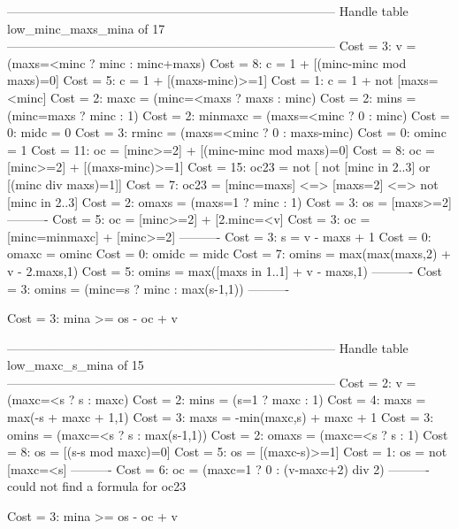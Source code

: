 --------------------------------------------------------------------------------
Handle table low_minc_maxs_mina of 17
--------------------------------------------------------------------------------
Cost =  3:  v       = (maxs=<minc ? minc : minc+maxs)
Cost =  8:  c       = 1 + [(minc-minc mod maxs)=0]
Cost =  5:  c       = 1 + [(maxs-minc)>=1]
Cost =  1:  c       = 1 + not [maxs=<minc]
Cost =  2:  maxc    = (minc=<maxs ? maxs : minc)
Cost =  2:  mins    = (minc=maxs ? minc : 1)
Cost =  2:  minmaxc = (maxs=<minc ? 0 : minc)
Cost =  0:  midc    = 0
Cost =  3:  rminc   = (maxs=<minc ? 0 : maxs-minc)
Cost =  0:  ominc   = 1
Cost = 11:  oc      = [minc>=2] + [(minc-minc mod maxs)=0]
Cost =  8:  oc      = [minc>=2] + [(maxs-minc)>=1]
Cost = 15:  oc23    = not [ not [minc in 2..3] or [(minc div maxs)=1]]
Cost =  7:  oc23    = [minc=maxs] <=> [maxs=2] <=>  not [minc in 2..3]
Cost =  2:  omaxs   = (maxs=1 ? minc : 1)
Cost =  3:  os      = [maxs>=2]
----------
Cost =  5:  oc      = [minc>=2] + [2.minc=<v]
Cost =  3:  oc      = [minc=minmaxc] + [minc>=2]
----------
Cost =  3:  s       = v - maxs + 1
Cost =  0:  omaxc   = ominc
Cost =  0:  omidc   = midc
Cost =  7:  omins   = max(max(maxs,2) + v - 2.maxs,1)
Cost =  5:  omins   = max([maxs in 1..1] + v - maxs,1)
----------
Cost =  3:  omins   = (minc=s ? minc : max(s-1,1))
----------

Cost =  3:  mina >= os - oc + v

--------------------------------------------------------------------------------
Handle table low_maxc_s_mina of 15
--------------------------------------------------------------------------------
Cost =  2:  v     = (maxc=<s ? s : maxc)
Cost =  2:  mins  = (s=1 ? maxc : 1)
Cost =  4:  maxs  = max(-s + maxc + 1,1)
Cost =  3:  maxs  = -min(maxc,s) + maxc + 1
Cost =  3:  omins = (maxc=<s ? s : max(s-1,1))
Cost =  2:  omaxs = (maxc=<s ? s : 1)
Cost =  8:  os    = [(s-s mod maxc)=0]
Cost =  5:  os    = [(maxc-s)>=1]
Cost =  1:  os    = not [maxc=<s]
----------
Cost =  6:  oc    = (maxc=1 ? 0 : (v-maxc+2) div 2)
----------
could not find a formula for oc23

Cost =  3:  mina >= os - oc + v

